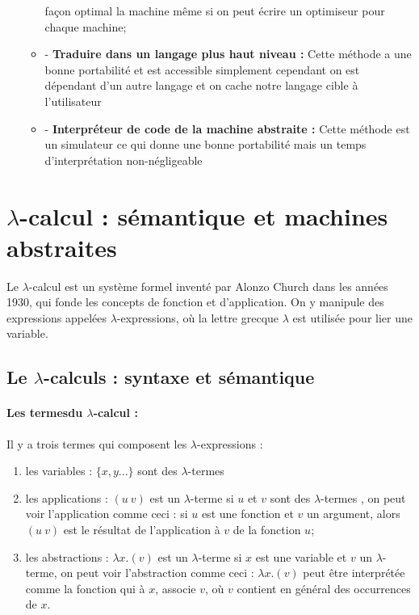 \documentclass[10pt,a4paper]{report}
\begin{document}
\begin{itemize}
\begin{itemize}
    façon optimal la machine même si on peut écrire un optimiseur pour chaque machine;
  \item[] - \textbf{Traduire dans un langage plus haut niveau :} Cette méthode a une bonne portabilité et est accessible simplement cependant
    on est dépendant d'un autre langage et on cache notre langage cible à l'utilisateur
  \item[] - \textbf{Interpréteur de code de la machine abstraite :} Cette méthode est un simulateur ce qui donne une bonne portabilité mais un
    temps d'interprétation non-négligeable
  \end{itemize}
\end{itemize}

\section{$\lambda$-calcul : sémantique et machines abstraites}

Le $\lambda$-calcul est un système formel inventé par Alonzo Church dans les années 1930, qui fonde les concepts de fonction et
d'application. On y manipule des expressions appelées $\lambda$-expressions, où la lettre grecque $\lambda$ est utilisée pour
lier une variable.
\subsection{Le $\lambda$-calculs : syntaxe et sémantique}

\paragraph{Les termesdu $\lambda$-calcul :}
 Il y a trois termes qui composent les $\lambda$-expressions :
\begin{enumerate}
\item les variables : $\{x, y...\}$ sont des $\lambda$-termes 
\item les applications : $(u~v)$ est un $\lambda$-terme si $u$ et $v$ sont des $\lambda$-termes , on peut voir l'application
  comme ceci : si $u$ est une fonction et $v$ un argument, alors $(u~v)$ est le résultat de l'application à $v$ de la fonction $u$; 
\item les abstractions : $\lambda x.(v)$ est un $\lambda$-terme si $x$ est une variable et $v$ un $\lambda$-terme, on peut voir
  l'abstraction comme ceci : $\lambda x.(v)$ peut être interprétée comme la fonction qui à $x$, associe $v$, où $v$ contient en
  général des occurrences de $x$.
\end{enumerate}
\bigbreak
\end{document}
